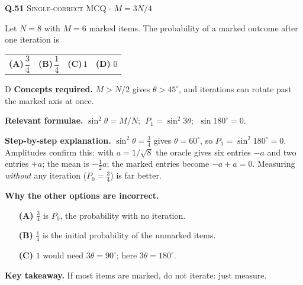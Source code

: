 \documentclass[11pt,a4paper]{article}
\newcommand{\optlabel}[1]{\textbf{(#1)}}
\newcommand{\correctlabel}[1]{\textcolor{okgreen}{\textbf{(#1)}\,\ding{51}}}
\newenvironment{qitem}[1]{\begin{list}{}{\setlength{\leftmargin}{3.3em}\setlength{\labelwidth}{3.1em}%
  \setlength{\labelsep}{0.2em}\setlength{\topsep}{3pt}\setlength{\parsep}{3pt}}\item[\textbf{Q.#1}\hfill]}{\end{list}}
\newcommand{\qsep}{\par\vspace{2pt}{\color{black!15}\hrule}\vspace{4pt}}
\newcommand{\qmeta}[2]{{\footnotesize\color{black!60}\textsc{#1} \;$\cdot$\; #2}\par}
\begin{document}
\begin{qitem}{51}
\qmeta{Single-correct MCQ}{$M = 3N/4$}
Let $N = 8$ with $M = 6$ marked items. The probability of a marked outcome after one iteration is
\par\smallskip\noindent\begin{tabularx}{\linewidth}{@{}*{4}{L}@{}}
\optlabel{A}\,$\dfrac34$ & \optlabel{B}\,$\dfrac14$ & \optlabel{C}\,$1$ & \correctlabel{D}\,$0$
\end{tabularx}
\end{qitem}
\begin{solbox}{D}
\textbf{\color{brand}Concepts required.} $M > N/2$ gives $\theta > 45^\circ$, and iterations can rotate past the marked axis at once.

\textbf{\color{brand}Relevant formulae.} $\sin^2\theta = M/N$; $\;P_1 = \sin^2 3\theta$; $\;\sin 180^\circ = 0$.

\textbf{\color{brand}Step-by-step explanation.} $\sin^2\theta = \frac34$ gives $\theta = 60^\circ$, so $P_1 = \sin^2 180^\circ = 0$. Amplitudes confirm this: with $a = 1/\sqrt8$ the oracle gives six entries $-a$ and two entries $+a$; the mean is $-\frac12a$;
the marked entries become $-a + a = 0$. Measuring \emph{without} any iteration ($P_0 = \frac34$) is far better.

\textbf{\color{brand}Why the other options are incorrect.}
\begin{itemize}[leftmargin=2.4em, itemsep=1pt, topsep=2pt]
\item[\textbf{(A)}] $\frac34$ is $P_0$, the probability with no iteration.
\item[\textbf{(B)}] $\frac14$ is the initial probability of the unmarked items.
\item[\textbf{(C)}] $1$ would need $3\theta = 90^\circ$; here $3\theta = 180^\circ$.
\end{itemize}
\textbf{\color{brand}Key takeaway.} If most items are marked, do not iterate: just measure.
\end{solbox}
\qsep
\end{document}
